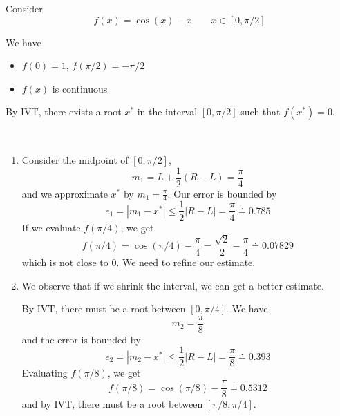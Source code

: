 \begin{example}
    Consider \[
        f(x) = \cos(x) - x \qquad x \in [0, \pi/2]
    \]

    \begin{figure}[H]
        \centering
    \end{figure}

    We have
    \begin{itemize}
        \item \( f(0) = 1 \), \( f(\pi/2) = -\pi/2 \)
        \item \( f(x) \) is continuous
    \end{itemize}

    By IVT, there exists a root \( x^\ast \) in the interval \( [0, \pi/2] \) such that \( f(x^\ast) = 0 \).

        {~~~}

    \begin{enumerate}
        \item Consider the midpoint of \( [0, \pi/2] \), \[
                  m_1 = L + \frac{1}{2}(R - L) = \frac{\pi}{4}
              \] and we approximate \( x^\ast \) by \( m_1 = \frac{\pi}{4} \). Our error is bounded by \[
                  e_1 = | m_1 - x^\ast | \leq \frac{1}{2} | R - L | = \frac{\pi}{4} \doteq 0.785
              \]
              If we evaluate \( f(\pi / 4) \), we get \[
                  f(\pi / 4) = \cos(\pi / 4) - \frac{\pi}{4} = \frac{\sqrt{2}}{2} - \frac{\pi}{4} \doteq 0.07829
              \] which is not close to 0. We need to refine our estimate.

        \item We observe that if we shrink the interval, we can get a better estimate.

              By IVT, there must be a root between \( [0, \pi/4] \). We have \[
                  m_2 = \frac{\pi}{8}
              \] and the error is bounded by \[
                  e_2 = | m_2 - x^\ast | \leq \frac{1}{2} | R - L | = \frac{\pi}{8} \doteq 0.393
              \]
              Evaluating \( f(\pi / 8) \), we get \[
                  f(\pi / 8) = \cos(\pi / 8) - \frac{\pi}{8} \doteq 0.5312
              \] and by IVT, there must be a root between \( [\pi/8, \pi/4] \).
    \end{enumerate}


\end{example}
